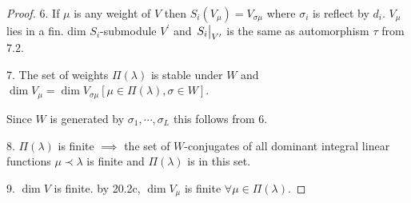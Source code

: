 \documentclass{article}
\theoremstyle{definition}
\begin{document}
\begin{proof}
        6. If \(\mu\) is any weight of \(V\) then \(S_i(V_\mu) = V_{\sigma \mu}\) where \(\sigma_i\) is reflect by \(d_i\). \(V_\mu\) lies in a fin. dim \(S_i\)-submodule \(V^{\prime}\) and \(\eval{S_i}_{V^{\prime}}\) is the same as automorphism \(\tau\) from 7.2.

        7. The set of weights \(\Pi(\lambda)\) is stable under \(W\) and \(\dim V_\mu = \dim V_{\sigma \mu} [\mu \in \Pi (\lambda), \sigma \in W]\).
        
        Since \(W\) is generated by \(\sigma_1 , \cdots , \sigma_L\) this follows from 6.

        8. \(\Pi(\lambda)\) is finite \(\implies\) the set of \(W\)-conjugates of all dominant integral linear functions \(\mu \prec \lambda\) is finite and \(\Pi(\lambda)\) is in this set.

        9. \(\dim V\) is finite. by 20.2c, \(\dim V_\mu\) is finite \(\forall \mu \in \Pi(\lambda)\). 

    \end{proof}
\end{document}
